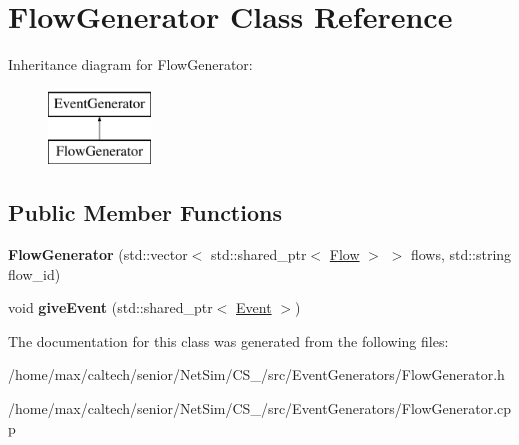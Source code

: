 \hypertarget{classFlowGenerator}{\section{\-Flow\-Generator \-Class \-Reference}
\label{classFlowGenerator}
}
\-Inheritance diagram for \-Flow\-Generator\-:\begin{figure}[H]
\begin{center}
\leavevmode
\includegraphics[height=2.000000cm]{classFlowGenerator}
\end{center}
\end{figure}
\subsection*{\-Public \-Member \-Functions}
\begin{DoxyCompactItemize}
\item 
\hypertarget{classFlowGenerator_ae51c2e304770a911f9cc1d8e0d01310c}{{\bfseries \-Flow\-Generator} (std\-::vector$<$ std\-::shared\-\_\-ptr$<$ \hyperlink{classFlow}{\-Flow} $>$ $>$ flows, std\-::string flow\-\_\-id)}\label{classFlowGenerator_ae51c2e304770a911f9cc1d8e0d01310c}

\item 
\hypertarget{classFlowGenerator_a5c4ac4997c37c524a7c1c8ab264eb882}{void {\bfseries give\-Event} (std\-::shared\-\_\-ptr$<$ \hyperlink{classEvent}{\-Event} $>$)}\label{classFlowGenerator_a5c4ac4997c37c524a7c1c8ab264eb882}

\end{DoxyCompactItemize}


\-The documentation for this class was generated from the following files\-:\begin{DoxyCompactItemize}
\item 
/home/max/caltech/senior/\-Net\-Sim/\-C\-S\-\_/src/\-Event\-Generators/\-Flow\-Generator.\-h\item 
/home/max/caltech/senior/\-Net\-Sim/\-C\-S\-\_/src/\-Event\-Generators/\-Flow\-Generator.\-cpp\end{DoxyCompactItemize}
